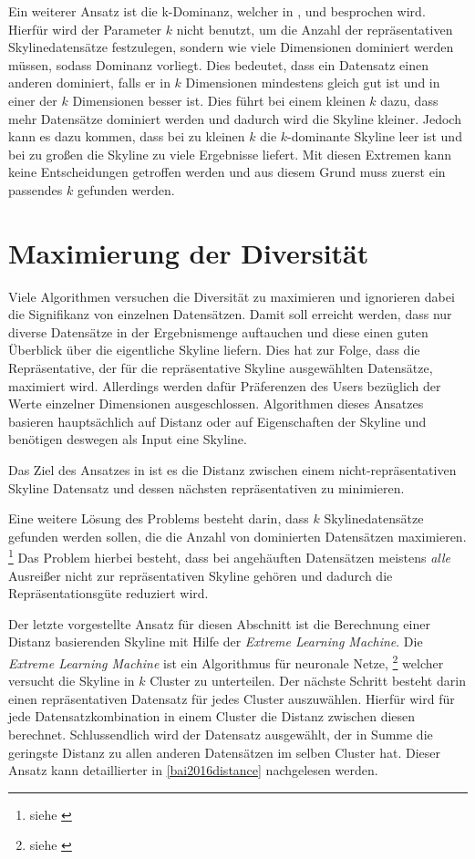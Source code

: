 Ein weiterer Ansatz ist die k-Dominanz, welcher in \cite{Chan:2006:FKS:1142473.1142530}, \cite{Chan:2006:HDS:2117976.2118017} und \cite{5480364} besprochen wird. Hierfür wird der Parameter $k$ nicht benutzt, um die Anzahl der repräsentativen Skylinedatensätze festzulegen, sondern wie viele Dimensionen dominiert werden müssen, sodass Dominanz vorliegt. Dies bedeutet, dass ein Datensatz einen anderen dominiert, falls er  in $k$ Dimensionen mindestens gleich gut ist und in einer der $k$ Dimensionen besser ist. Dies führt bei einem kleinen $k$ dazu, dass mehr Datensätze dominiert werden und dadurch wird die Skyline kleiner. Jedoch kann es dazu kommen, dass bei zu kleinen $k$ die $k$-dominante Skyline leer ist und bei zu großen die Skyline zu viele Ergebnisse liefert. Mit diesen Extremen kann keine Entscheidungen getroffen werden und aus diesem Grund muss zuerst ein passendes $k$ gefunden werden.
\section{Maximierung der Diversität}
\label{ch:Forschungsstand:sec:maxDiv}
Viele Algorithmen versuchen die Diversität zu maximieren und ignorieren dabei die Signifikanz von einzelnen Datensätzen. Damit soll erreicht werden, dass nur diverse Datensätze in der Ergebnismenge auftauchen und diese einen guten Überblick über die eigentliche Skyline liefern.
Dies hat zur Folge, dass die Repräsentative, der für die repräsentative Skyline ausgewählten Datensätze, maximiert wird. Allerdings werden dafür Präferenzen des Users bezüglich der Werte einzelner Dimensionen ausgeschlossen. Algorithmen dieses Ansatzes basieren hauptsächlich auf Distanz oder auf Eigenschaften der Skyline und benötigen deswegen als Input eine Skyline. 

Das Ziel des Ansatzes in \cite{Tao:2009:DRS:1546683.1547325} ist es die Distanz zwischen einem nicht-repräsentativen Skyline Datensatz und dessen nächsten repräsentativen zu minimieren. 

Eine weitere Lösung des Problems besteht darin, dass $k$ Skylinedatensätze gefunden werden sollen, die die Anzahl von dominierten Datensätzen maximieren. \footnote{siehe \cite{4221657}} Das Problem hierbei besteht, dass bei angehäuften Datensätzen meistens \textit{alle} Ausreißer nicht zur repräsentativen Skyline gehören und dadurch die Repräsentationsgüte reduziert wird.

Der letzte vorgestellte Ansatz für diesen Abschnitt ist die Berechnung einer Distanz basierenden Skyline mit Hilfe der \textit{Extreme Learning Machine}. Die \textit{Extreme Learning Machine} ist ein Algorithmus für neuronale Netze, \footnote{siehe \cite{huang2006extreme}} welcher versucht die Skyline in $k$ Cluster zu unterteilen. Der nächste Schritt besteht darin einen repräsentativen Datensatz für jedes Cluster auszuwählen. Hierfür wird für jede Datensatzkombination in einem Cluster die Distanz zwischen diesen berechnet. Schlussendlich wird der Datensatz ausgewählt, der in Summe die geringste Distanz zu allen anderen Datensätzen im selben Cluster hat. Dieser Ansatz kann detaillierter in \ref{bai2016distance} nachgelesen werden.
